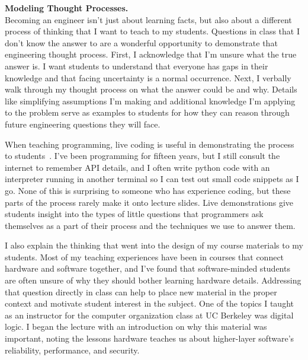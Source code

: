 \documentclass[11pt]{article} %
\begin{document}
\bigskip
\textbf{\textsf{\large Modeling Thought Processes.}}\\
Becoming an engineer isn't just about learning facts, but also about a
different process of thinking that I want to teach to my students. Questions in
class that I don't know the answer to are a wonderful opportunity to
demonstrate that engineering thought process. First, I acknowledge that I'm
unsure what the true answer is. I want students to understand that everyone has
gaps in their knowledge and that facing uncertainty is a normal occurrence.
Next, I verbally walk through my thought process on what the answer could be
and why. Details like simplifying assumptions I'm making and additional
knowledge I'm applying to the problem serve as examples to students for how
they can reason through future engineering questions they will face.

When teaching programming, live coding is useful in demonstrating the process
to students~\footnotemark{}. I've been programming for fifteen years, but I still
consult the internet to remember API details, and I often write python code
with an interpreter running in another terminal so I can test out small code
snippets as I go. None of this is surprising to someone who has experience
coding, but these parts of the process rarely make it onto lecture slides. Live
demonstrations give students insight into the types of little questions that
programmers ask themselves as a part of their process and the techniques we use
to answer them.


I also explain the thinking that went into the design of my course materials
to my students.
%
Most of my teaching experiences have been in courses that connect hardware and
software together, and I've found that software-minded students are often
unsure of why they should bother learning hardware details. Addressing that
question directly in class can help to place new material in the proper context
and motivate student interest in the subject.
%
One of the topics I taught as an instructor for the computer organization class
at UC Berkeley was digital logic. I began the lecture with an introduction on
why this material was important, noting the lessons hardware teaches us about
higher-layer software's reliability, performance, and security.
\end{document}
